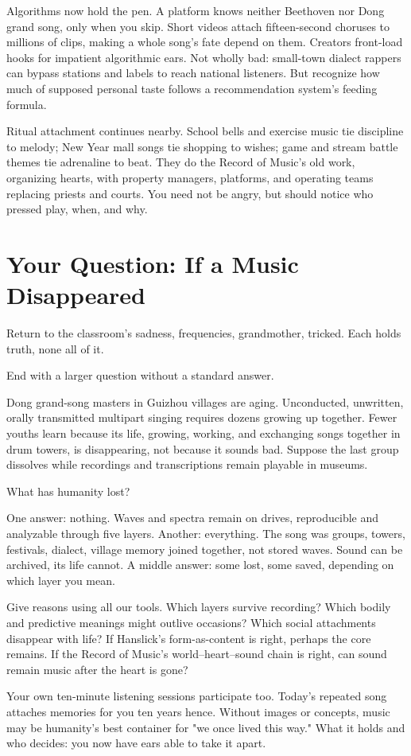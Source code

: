 Algorithms now hold the pen. A platform knows neither Beethoven nor Dong grand song, only when you skip. Short videos attach fifteen-second choruses to millions of clips, making a whole song's fate depend on them. Creators front-load hooks for impatient algorithmic ears. Not wholly bad: small-town dialect rappers can bypass stations and labels to reach national listeners. But recognize how much of supposed personal taste follows a recommendation system's feeding formula.

Ritual attachment continues nearby. School bells and exercise music tie discipline to melody; New Year mall songs tie shopping to wishes; game and stream battle themes tie adrenaline to beat. They do the Record of Music's old work, organizing hearts, with property managers, platforms, and operating teams replacing priests and courts. You need not be angry, but should notice who pressed play, when, and why.

\section{Your Question: If a Music Disappeared}
Return to the classroom's sadness, frequencies, grandmother, tricked. Each holds truth, none all of it.

End with a larger question without a standard answer.

Dong grand-song masters in Guizhou villages are aging. Unconducted, unwritten, orally transmitted multipart singing requires dozens growing up together. Fewer youths learn because its life, growing, working, and exchanging songs together in drum towers, is disappearing, not because it sounds bad. Suppose the last group dissolves while recordings and transcriptions remain playable in museums.

What has humanity lost?

One answer: nothing. Waves and spectra remain on drives, reproducible and analyzable through five layers. Another: everything. The song was groups, towers, festivals, dialect, village memory joined together, not stored waves. Sound can be archived, its life cannot. A middle answer: some lost, some saved, depending on which layer you mean.

Give reasons using all our tools. Which layers survive recording? Which bodily and predictive meanings might outlive occasions? Which social attachments disappear with life? If Hanslick's form-as-content is right, perhaps the core remains. If the Record of Music's world--heart--sound chain is right, can sound remain music after the heart is gone?

Your own ten-minute listening sessions participate too. Today's repeated song attaches memories for you ten years hence. Without images or concepts, music may be humanity's best container for "we once lived this way." What it holds and who decides: you now have ears able to take it apart.
